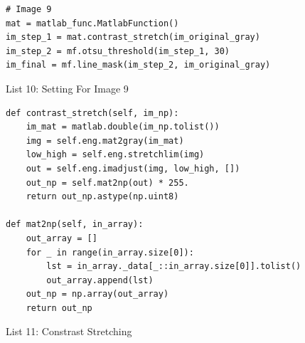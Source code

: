 \documentclass[titlepage]{article}
\begin{document}
\begin{listing}
\begin{verbatim}
# Image 9 
mat = matlab_func.MatlabFunction()
im_step_1 = mat.contrast_stretch(im_original_gray)
im_step_2 = mf.otsu_threshold(im_step_1, 30)
im_final = mf.line_mask(im_step_2, im_original_gray)
\end{verbatim}
\centering
\caption{List 10: Setting For Image 9}
\newline
\end{listing}

\begin{listing}
\begin{verbatim}
def contrast_stretch(self, im_np):
    im_mat = matlab.double(im_np.tolist())
    img = self.eng.mat2gray(im_mat)
    low_high = self.eng.stretchlim(img)
    out = self.eng.imadjust(img, low_high, [])
    out_np = self.mat2np(out) * 255.
    return out_np.astype(np.uint8)

def mat2np(self, in_array):
    out_array = []
    for _ in range(in_array.size[0]):
        lst = in_array._data[_::in_array.size[0]].tolist()
        out_array.append(lst)
    out_np = np.array(out_array)
    return out_np
\end{verbatim}
\centering
\caption{List 11: Constrast Stretching}
\newline
\end{listing}
\end{document}
